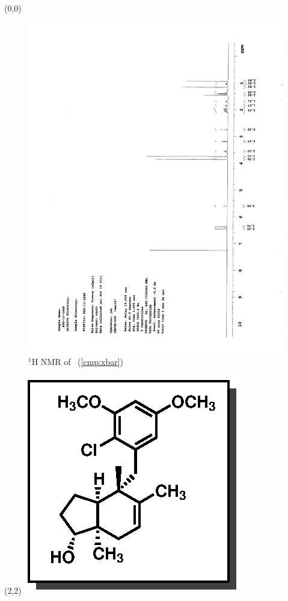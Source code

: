 \begin{textblock}{20}(0,0)
\begin{figure}[htb]
\caption{$^1$H NMR of \CMPxbar\ (\ref{cmp:xbar})}
\includegraphics[scale=0.75, trim = 0mm 0mm 0mm 5mm,
clip]{chp_singlecarbon/images/nmr/xbarH}
\vspace{-100pt}
\end{figure}
\end{textblock}
\begin{textblock}{1}(2,2)
\includegraphics[scale=0.8, angle=90]{chp_singlecarbon/images/xbar}
\end{textblock}
